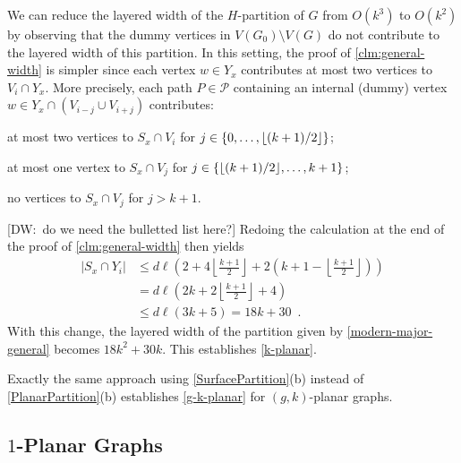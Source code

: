 \documentclass{patmorin}
\newcommand{\note}[2]{{\color{red}[#1:~#2]}}
\DeclarePairedDelimiter{\floor}{\lfloor}{\rfloor}
\renewcommand{\le}{\leqslant}
\begin{document}
We can reduce the layered width of the $H$-partition of $G$ from $O(k^3)$ to $O(k^2)$ by observing that the dummy vertices in $V(G_0)\setminus V(G)$ do not contribute to the layered width of this partition.  In this setting, the proof of \cref{clm:general-width} is simpler since each vertex $w\in Y_x$ contributes at most two vertices to $V_i\cap Y_x$.  More precisely, each path $P\in\mathcal{P}$ containing an internal (dummy) vertex $w\in Y_x\cap (V_{i-j}\cup V_{i+j})$ contributes:
\begin{compactitem}
  \item  at most two vertices to $S_x\cap V_i$ for $j\in\{0,\ldots,\floor{(k+1)/2}\}$;
  \item at most one vertex to $S_x\cap V_j$ for $j\in\{\floor{(k+1)/2},\ldots,k+1\}$; 
  \item no vertices to $S_x\cap V_j$ for $j > k+1$.
\end{compactitem}
\note{DW}{do we need the bulletted list here?}
Redoing the calculation at the end of the proof of \cref{clm:general-width} then yields 
\begin{align*}
    |S_x\cap Y_i| &\le d\ell\left( 
       2 
       + 4\left\lfloor\frac{k+1}{2}\right\rfloor 
       + 2\left(k+1-\left\lfloor\frac{k+1}{2}\right\rfloor\right)
       \right)\\
       & =
       d\ell\left(
         2k + 2\left\lfloor\frac{k+1}{2}\right\rfloor + 4
       \right) \\
       & \le
       d\ell(3k+5) = 18k+30 \enspace .
\end{align*}    
With this change, the layered width of the partition given by \cref{modern-major-general} becomes $18k^2+30k$.  This establishes \cref{k-planar}.

Exactly the same approach using \cref{SurfacePartition}(b) instead of \cref{PlanarPartition}(b) establishes 
\cref{g-k-planar} for $(g,k)$-planar graphs. 


\subsection{\boldmath  $1$-Planar Graphs}
\label{sec-1-planar}
\end{document}
